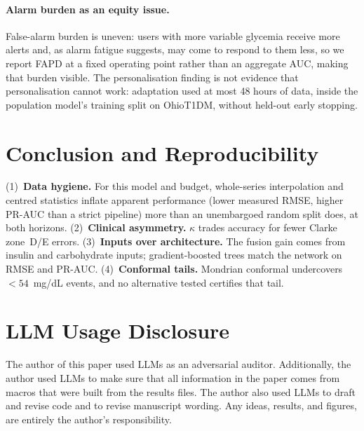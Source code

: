 \documentclass[pmlr,twocolumn,10pt]{jmlr}
\begin{document}
\paragraph{Alarm burden as an equity issue.} False-alarm burden is uneven: users
with more variable glycemia receive more alerts and, as alarm fatigue suggests,
may come to respond to them less, so we
report FAPD at a fixed operating point rather than an aggregate AUC, making that
burden visible. The personalisation finding is not evidence that
personalisation cannot work: adaptation used at most 48 hours of data, inside
the population model's training split on OhioT1DM, without held-out early
stopping.

\section{Conclusion and Reproducibility}

(1)~\textbf{Data hygiene.} For this model and budget, whole-series
interpolation and centred statistics inflate apparent performance (lower
measured RMSE, higher PR-AUC than a strict pipeline) more than an unembargoed
random split does, at both horizons. (2)~\textbf{Clinical asymmetry.}
$\kappa$ trades accuracy for fewer Clarke zone~D/E errors.
(3)~\textbf{Inputs over architecture.} The fusion gain comes from insulin and
carbohydrate inputs; gradient-boosted trees match the network on RMSE and PR-AUC.
(4)~\textbf{Conformal tails.} Mondrian conformal undercovers $<54$~mg/dL events,
and no alternative tested certifies that tail.


\section*{LLM Usage Disclosure}
The author of this paper used LLMs as an adversarial auditor. Additionally, the
author used LLMs to make sure that all information in the paper comes from
macros that were built from the results files. The author also used LLMs to
draft and revise code and to revise manuscript wording. Any ideas, results, and
figures, are entirely the author's responsibility.
\end{document}
